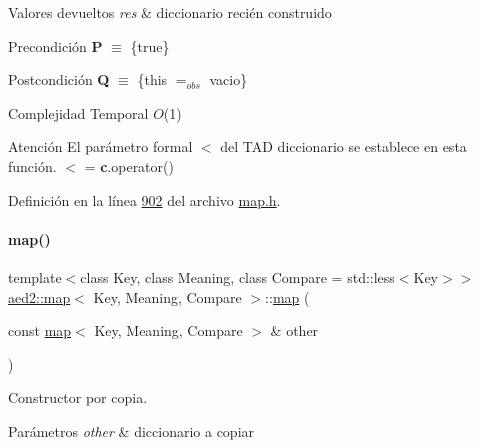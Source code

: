 \begin{DoxyRetVals}{Valores devueltos}
{\em res} & diccionario recién construido\\
\hline
\end{DoxyRetVals}
\begin{DoxyPrecond}{Precondición}
{\bfseries P} $\equiv$ \{true\} 
\end{DoxyPrecond}
\begin{DoxyPostcond}{Postcondición}
{\bfseries Q} $\equiv$ \{this $=_{obs}$ vacio\}
\end{DoxyPostcond}

\begin{DoxyDescription}
\item[Complejidad Temporal]$O$(1)
\end{DoxyDescription}

\begin{DoxyAttention}{Atención}
El parámetro formal $<$ del T\+AD diccionario se establece en esta función. $<$ = {\bfseries c}.operator() 
\end{DoxyAttention}


Definición en la línea \hyperlink{map_8h_source_l00902}{902} del archivo \hyperlink{map_8h_source}{map.\+h}.

\mbox{\label{classaed2_1_1map_a7a77950a3d8e637bfa7cf5dcd904f257_a7a77950a3d8e637bfa7cf5dcd904f257}} 
\paragraph{\texorpdfstring{map()}{map()}\hspace{0.1cm}{\footnotesize\ttfamily [2/3]}}
{\footnotesize\ttfamily template$<$class Key, class Meaning, class Compare = std\+::less$<$\+Key$>$$>$ \\
\hyperlink{classaed2_1_1map}{aed2\+::map}$<$ Key, Meaning, Compare $>$\+::\hyperlink{classaed2_1_1map}{map} (\begin{DoxyParamCaption}\item[{const \hyperlink{classaed2_1_1map}{map}$<$ Key, Meaning, Compare $>$ \&}]{other }\end{DoxyParamCaption})\hspace{0.3cm}{\ttfamily [inline]}}



Constructor por copia. 


\begin{DoxyParams}{Parámetros}
{\em other} & diccionario a copiar \\
\hline
\end{DoxyParams}

